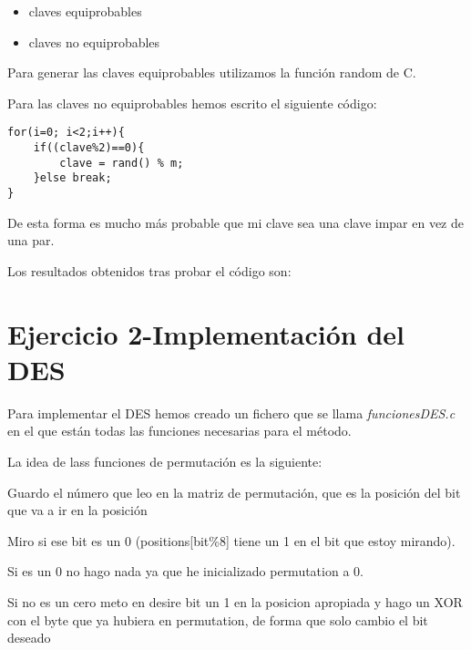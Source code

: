 \documentclass{apuntes}
\begin{document}
\begin{itemize}
	\item claves equiprobables
	\item claves no equiprobables
\end{itemize}

Para generar las claves equiprobables utilizamos la función random de C.

Para las claves no equiprobables hemos escrito el siguiente código:


\begin{lstlisting}
for(i=0; i<2;i++){
	if((clave%2)==0){
		clave = rand() % m;
	}else break;
}
\end{lstlisting}



De esta forma es mucho más probable que mi clave sea una clave impar en vez de una par. 


Los resultados obtenidos tras probar el código son:



\section{Ejercicio 2-Implementación del DES}

Para implementar el DES hemos creado un fichero que se llama \textit{funcionesDES.c} en el que están todas las funciones necesarias para el método.

La idea de lass funciones de permutación es la siguiente:

 Guardo el número que leo en la matriz de permutación, que es la posición del bit que va a ir en la posición 
 
 Miro si ese bit es un 0 (positions[bit\%8] tiene un 1 en el bit que estoy mirando).
 
 Si es un 0 no hago nada ya que he inicializado permutation a 0.
 
 Si no es un cero meto en desire bit un 1 en la posicion apropiada y hago un 
 XOR con el byte que ya hubiera en permutation, de forma que solo cambio el bit deseado




\printindex
\end{document}
